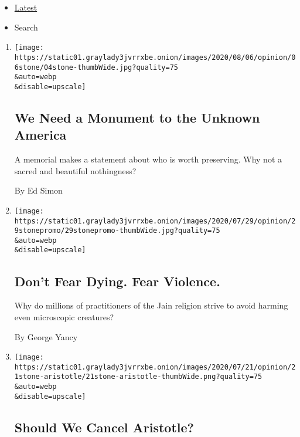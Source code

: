 \begin{itemize}
\tightlist
\item
  \protect\hyperlink{stream-panel}{Latest}
\item
  Search
\end{itemize}

\begin{enumerate}
\def\labelenumi{\arabic{enumi}.}
\item
  \href{/2020/08/04/opinion/us-monuments-rome-unknown-god.html}{}

  \texttt{[image: https://static01.graylady3jvrrxbe.onion/images/2020/08/06/opinion/06stone/04stone-thumbWide.jpg?quality=75\\\&auto=webp\\\&disable=upscale]}

  \hypertarget{we-need-a-monument-to-the-unknown-america}{%
  \subsection{We Need a Monument to the Unknown
  America}\label{we-need-a-monument-to-the-unknown-america}}

  A memorial makes a statement about who is worth preserving. Why not a
  sacred and beautiful nothingness?

  By Ed Simon
\item
  \href{/2020/07/29/opinion/jainism-nonviolence-death.html}{}

  \texttt{[image: https://static01.graylady3jvrrxbe.onion/images/2020/07/29/opinion/29stonepromo/29stonepromo-thumbWide.jpg?quality=75\\\&auto=webp\\\&disable=upscale]}

  \hypertarget{dont-fear-dying-fear-violence}{%
  \subsection{Don't Fear Dying. Fear
  Violence.}\label{dont-fear-dying-fear-violence}}

  Why do millions of practitioners of the Jain religion strive to avoid
  harming even microscopic creatures?

  By George Yancy
\item
  \href{/2020/07/21/opinion/should-we-cancel-aristotle.html}{}

  \texttt{[image: https://static01.graylady3jvrrxbe.onion/images/2020/07/21/opinion/21stone-aristotle/21stone-aristotle-thumbWide.png?quality=75\\\&auto=webp\\\&disable=upscale]}

  \hypertarget{should-we-cancel-aristotle}{%
  \subsection{Should We Cancel
  Aristotle?}\label{should-we-cancel-aristotle}}


\end{enumerate}
